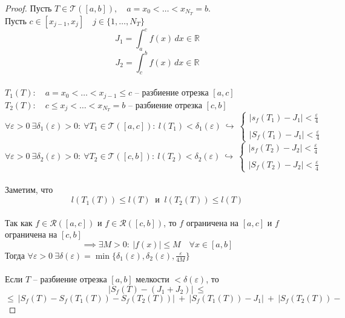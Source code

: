 \documentclass[11pt]{article}
\begin{document}
\begin{proof}
  Пусть $T \in \mathcal{T}([a, b]), \quad a = x_0 < \dots < x_{N_T} = b$. \\
  Пусть $c \in [x_{j - 1}, x_j] \quad j \in \{1, \dots, N_T\}$
  \[J_1 = \int_{a}^{c} f(x)\,dx \in \mathbb{R}\]
  \[J_2 = \int_{c}^{b} f(x)\,dx \in \mathbb{R}\] \\
  $T_1(T): \quad a = x_0 < \dots < x_{j - 1} \leq c$ -- разбиение отрезка $[a, c]$ \\ 
  $T_2(T): \quad c \leq x_j < \dots < x_{N_T} = b$ -- разбиение отрезка $[c, b]$ \\
  \[\forall \varepsilon > 0 \ \exists \delta_1(\varepsilon) > 0: \ \forall T_1 
  \in \mathcal{T}([a, c]): \ l(T_1) < \delta_1(\varepsilon) \ \hookrightarrow \ 
  \begin{cases}
    \left\lvert s_f(T_1) - J_1 \right\rvert < \displaystyle \frac{\varepsilon}{4} \\
    \\
    \left\lvert S_f(T_1) - J_1 \right\rvert < \displaystyle \frac{\varepsilon}{4}
  \end{cases}\]
  \[\forall \varepsilon > 0 \ \exists \delta_2(\varepsilon) > 0: \ \forall T_2 
  \in \mathcal{T}([c, b]): \ l(T_2) < \delta_2(\varepsilon) \ \hookrightarrow \ 
  \begin{cases}
    \left\lvert s_f(T_2) - J_2 \right\rvert < \displaystyle \frac{\varepsilon}{4} \\
    \\
    \left\lvert S_f(T_2) - J_2 \right\rvert < \displaystyle \frac{\varepsilon}{4}
  \end{cases}\] \\
  Заметим, что \[l(T_1(T)) \leq l(T) \ \text{ и } \ l(T_2(T)) \leq l(T)\] \\
  Так как $f \in \mathcal{R}([a, c])$ и $f \in \mathcal{R}([c, b])$, то $f$ 
  ограничена на $[a, c]$ и $f$ ограничена на $[c, b]$
  \[\implies \exists M > 0: \ \left\lvert f(x) \right\rvert \leq M \quad \forall x \in [a, b]\]
  Тогда $\forall \varepsilon > 0 \ \exists \delta(\varepsilon) = \min 
  \{\delta_1(\varepsilon), \delta_2(\varepsilon), \displaystyle \frac{\varepsilon}{4M}\}$ \\ \\
  Если $T$ -- разбиение отрезка $[a, b]$ мелкости $< \delta(\varepsilon)$, то 
  \[\left\lvert S_f(T) - (J_1 + J_2) \right\rvert \ \leq\]
  \[\leq \ \left\lvert S_f(T) - S_f(T_1(T)) - S_f(T_2(T)) \right\rvert \ + \ 
  \left\lvert S_f(T_1(T)) - J_1 \right\rvert \ + \ \left\lvert S_f(T_2(T)) - 
\]
\end{proof}
\end{document}
